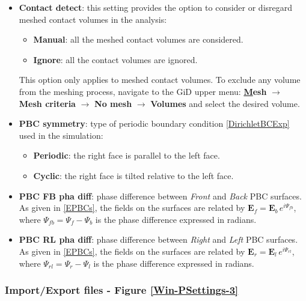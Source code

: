 \begin{itemize}
	\quad
	\item \textbf{Contact detect}: this setting provides the option to consider or disregard meshed contact volumes in the analysis:
    \begin{itemize}\itemsep0em 
	    \item \textbf{Manual}: all the meshed contact volumes are considered.
	    \item \textbf{Ignore}: all the contact volumes are ignored.
    \end{itemize}
    This option only applies to meshed contact volumes. To exclude any volume from the meshing process, navigate to the GiD upper menu: \textbf{\underline{M}esh} $\rightarrow$ \textbf{Mesh criteria} $\rightarrow$ \textbf{No mesh} $\rightarrow$ \textbf{Volumes} and select the desired volume.
	\quad
	\item \textbf{PBC symmetry}: type of periodic boundary condition \ref{DirichletBCExp} used in the simulation: 
    \begin{itemize}\itemsep0em 
    	\item \textbf{Periodic}: the right face is parallel to the left face.
	    \item \textbf{Cyclic}: the right face is tilted relative to the left face.
    \end{itemize}		   
	\item \textbf{PBC FB pha diff}: phase difference between \textit{Front} and \textit{Back} PBC surfaces. As given in \eqref{EPBCs}, the fields on the surfaces are related by $\mathbf{E}_f = \mathbf{E}_b \, e^{i\Psi_{fb}}$, where $\Psi_{fb} = \Psi_f - \Psi_b$ is the phase difference expressed in radians.
	\item \textbf{PBC RL pha diff}: phase difference between \textit{Right} and \textit{Left} PBC surfaces. As given in \eqref{EPBCs}, the fields on the surfaces are related by $\mathbf{E}_r = \mathbf{E}_l \, e^{i\Psi_{rl}}$, where $\Psi_{rl} = \Psi_r - \Psi_l$ is the phase difference expressed in radians.
\end{itemize}

\subsubsection{Import/Export files - Figure \ref{Win-PSettings-3}}\label{ImportExportSettings}

